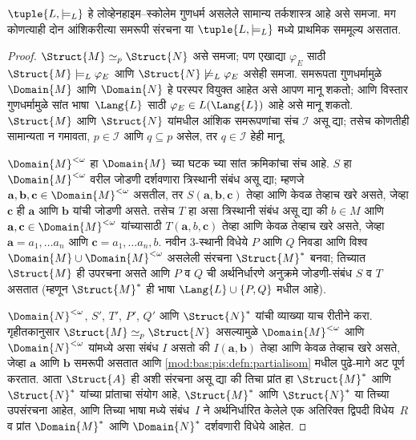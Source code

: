 \begin{thm}
\label{mod:lin:lsp:thm:abstract-p-isom}
$\tuple{L, \models_L}$ हे लोव्हेनहाइम--स्कोलेम गुणधर्म असलेले सामान्य
तर्कशास्त्र आहे असे समजा. मग कोणत्याही दोन आंशिकरीत्या समरूपी
संरचना या $\tuple{L, \models_L}$ मध्ये प्राथमिक सममूल्य असतात.
\end{thm}

\begin{proof}
$\Struct{M} \simeq_p \Struct{N}$ असे समजा; पण एखाद्या $\varphi_{E}$ साठी
$\Struct{M} \models_L \varphi_{E}$ आणि $\Struct{N} \not\models_L \varphi_{E}$ असेही
समजा. समरूपता गुणधर्मामुळे $\Domain{M}$ आणि $\Domain{N}$ हे परस्पर
वियुक्त आहेत असे आपण मानू शकतो; आणि विस्तार गुणधर्मामुळे सांत
भाषा~$\Lang{L}$ साठी $\varphi_{E} \in L(\Lang{L})$ आहे असे मानू शकतो.
$\Struct{M}$ आणि $\Struct{N}$ यांमधील आंशिक समरूपणांचा संच
$\mathcal{I}$ असू द्या; तसेच कोणतीही सामान्यता न गमावता, $p \in
\mathcal{I}$ आणि $q \subseteq p$ असेल, तर $q \in \mathcal{I}$ हेही
मानू.

$\Domain{M}^{<\omega}$ हा $\Domain{M}$ च्या घटक च्या सांत
क्रमिकांचा संच आहे. $S$ हा $\Domain{M}^{<\omega}$ वरील जोडणी दर्शवणारा
त्रिस्थानी संबंध असू द्या; म्हणजे $\mathbf{a}, \mathbf{b},
\mathbf{c} \in \Domain{M}^{<\omega}$ असतील, तर $S(\mathbf{a},
\mathbf{b}, \mathbf{c})$ तेव्हा आणि केवळ तेव्हाच खरे असते, जेव्हा
$\mathbf{c}$ ही $\mathbf{a}$ आणि $\mathbf{b}$ यांची जोडणी असते. तसेच
$T$ हा असा त्रिस्थानी संबंध असू द्या की $b \in M$ आणि
$\mathbf{a}, \mathbf{c} \in \Domain{M}^{<\omega}$ यांच्यासाठी
$T(\mathbf{a}, b, \mathbf{c})$ तेव्हा आणि केवळ तेव्हाच खरे असते,
जेव्हा $\mathbf{a} = a_1, \dots a_n$ आणि $\mathbf{c} = a_1, \dots
a_n, b$. नवीन 3-स्थानी विधेये $P$ आणि $Q$ निवडा आणि विश्व
$\Domain{M} \cup \Domain{M}^{<\omega}$ असलेली संरचना
$\Struct{M}^*$ बनवा; तिच्यात $\Struct{M}$ ही उपरचना असते आणि $P$ व
$Q$ ची अर्थनिर्धारणे अनुक्रमे जोडणी-संबंध $S$ व $T$ असतात (म्हणून
$\Struct{M}^*$ ही भाषा $\Lang{L} \cup \{ P, Q\}$ मधील आहे).

$\Domain{N}^{<\omega}$, $S'$, $T'$, $P'$, $Q'$ आणि $\Struct{N}^*$
यांची व्याख्या याच रीतीने करा. गृहीतकानुसार $\Struct{M} \simeq_p
\Struct{N}$ असल्यामुळे $\Domain{M}^{<\omega}$ आणि
$\Domain{N}^{<\omega}$ यांमध्ये असा संबंध $I$ असतो की
$I(\mathbf{a}, \mathbf{b})$ तेव्हा आणि केवळ तेव्हाच खरे असते, जेव्हा
$\mathbf{a}$ आणि $\mathbf{b}$ समरूपी असतात आणि
\ref{mod:bas:pis:defn:partialisom} मधील पुढे-मागे अट पूर्ण करतात. आता
$\Struct{A}$ ही अशी संरचना असू द्या की तिचा प्रांत हा
$\Struct{M}^*$ आणि $\Struct{N}^*$ यांच्या प्रांताचा संयोग आहे,
$\Struct{M}^*$ आणि $\Struct{N}^*$ या तिच्या उपसंरचना आहेत,
आणि तिच्या भाषा मध्ये संबंध~$I$ ने अर्थनिर्धारित केलेले एक
अतिरिक्त द्विपदी विधेय~$R$ व प्रांत $\Domain{M}^*$ आणि
$\Domain{N}^*$ दर्शवणारी विधेये आहेत.



\end{proof}
